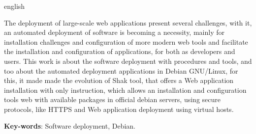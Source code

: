 \begin{resumo}[Abstract]
 \begin{otherlanguage*}{english}

   The deployment of large-scale web applications present several challenges, with
   it, an automated deployment of software is becoming a necessity, mainly for
   installation challenges and configuration of more modern web tools and
   facilitate the installation and configuration of applications, for both as
   developers and users. This work is about the software deployment with procedures
   and tools, and too about the automated deployment applications in Debian GNU/Linux,
   for this, it made made the evolution of Shak tool, that offers a Web
   application installation with only instruction, which allows an installation
   and configuration tools web with available packages in official debian servers,
   using secure protocols, like HTTPS and Web application deployment using virtual hosts.
   \vspace{\onelineskip}

   \noindent
   \textbf{Key-words}: Software deployment, Debian.
 \end{otherlanguage*}
\end{resumo}
